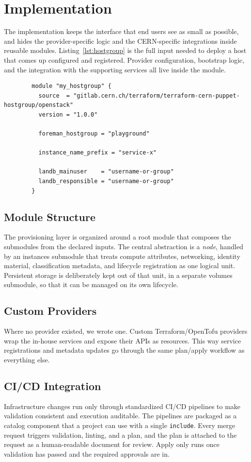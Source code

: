 \section{Implementation}\label{implementation}

The implementation keeps the interface that end users see as small as possible, and hides the provider-specific logic and the CERN-specific integrations inside reusable modules. Listing~\ref{lst:hostgroup} is the full input needed to deploy a host that comes up configured and registered. Provider configuration, bootstrap logic, and the integration with the supporting services all live inside the module.

\begin{listing}[ht]
    \begin{verbatim}
        module "my_hostgroup" {
          source  = "gitlab.cern.ch/terraform/terraform-cern-puppet-hostgroup/openstack"
          version = "1.0.0"

          foreman_hostgroup = "playground"

          instance_name_prefix = "service-x"

          landb_mainuser    = "username-or-group"
          landb_responsible = "username-or-group"
        }
    \end{verbatim}
    \caption{Minimal end-user instantiation of the module.}
    \label{lst:hostgroup}
\end{listing}

\subsection{Module Structure}
The provisioning layer is organized around a root module that composes the submodules from the declared inputs. The central abstraction is a \textit{node}, handled by an instances submodule that treats compute attributes, networking, identity material, classification metadata, and lifecycle registration as one logical unit. Persistent storage is deliberately kept out of that unit, in a separate volumes submodule, so that it can be managed on its own lifecycle.

\subsection{Custom Providers}
Where no provider existed, we wrote one. Custom Terraform/OpenTofu providers wrap the in-house services and expose their APIs as resources. This way service registrations and metadata updates go through the same plan/apply workflow as everything else.

\subsection{CI/CD Integration}
Infrastructure changes run only through standardized CI/CD pipelines to make validation consistent and execution auditable. The pipelines are packaged as a catalog component that a project can use with a single \texttt{include}. Every merge request triggers validation, linting, and a plan, and the plan is attached to the request as a human-readable document for review. Apply only runs once validation has passed and the required approvals are in.
